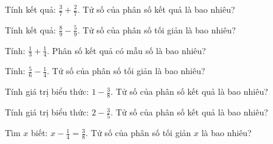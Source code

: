 
\begin{ex}
  Tính kết quả: $\frac{3}{7} + \frac{2}{7}$. Tử số của phân số kết quả là bao nhiêu?
\end{ex}

\begin{ex}
  Tính kết quả: $\frac{8}{9} - \frac{5}{9}$. Tử số của phân số tối giản là bao nhiêu?
\end{ex}

\begin{ex}
  Tính: $\frac{1}{3} + \frac{1}{4}$. Phân số kết quả có mẫu số là bao nhiêu?
\end{ex}

\begin{ex}
  Tính: $\frac{5}{6} - \frac{1}{4}$. Tử số của phân số tối giản là bao nhiêu?
\end{ex}

\begin{ex}
  Tính giá trị biểu thức: $1 - \frac{3}{8}$. Tử số của phân số kết quả là bao nhiêu?
\end{ex}

\begin{ex}
  Tính giá trị biểu thức: $2 - \frac{3}{5}$. Tử số của phân số kết quả là bao nhiêu?
\end{ex}

\begin{ex}
  Tìm $x$ biết: $x - \frac{1}{4} = \frac{3}{8}$. Tử số của phân số tối giản $x$ là bao nhiêu?
\end{ex}

